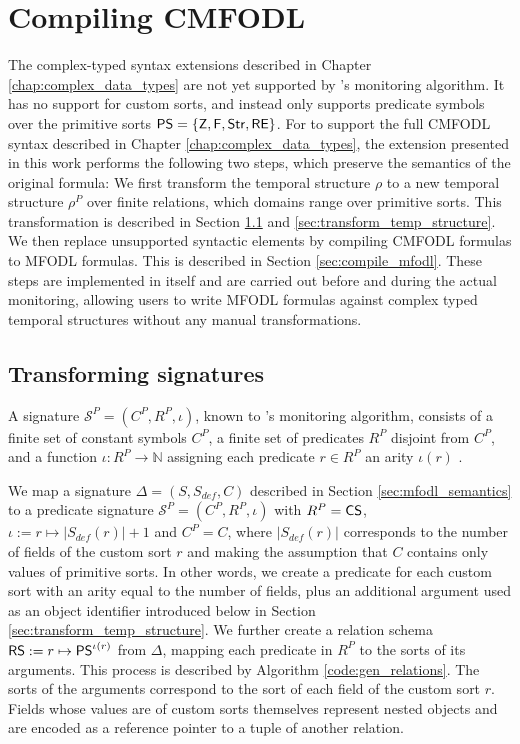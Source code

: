 \chapter{Compiling CMFODL}
\label{chap:compilation}

The complex-typed syntax extensions described in Chapter \ref{chap:complex_data_types} are not yet supported by \MonPoly's monitoring algorithm. It has no support for custom sorts, and instead only supports predicate symbols over the primitive sorts $\mathsf{PS} = \{ \mathsf{Z}, \mathsf{F}, \mathsf{Str}, \mathsf{RE} \}$. For \MonPoly to support the full CMFODL syntax described in Chapter \ref{chap:complex_data_types}, the extension presented in this work performs the following two steps, which preserve the semantics of the original formula: We first transform the temporal structure $\rho$ to a new temporal structure $\rho^P$ over finite relations, which domains range over primitive sorts. This transformation is described in Section \ref{sec:transform_signatures} and \ref{sec:transform_temp_structure}. We then replace unsupported syntactic elements by compiling CMFODL formulas to MFODL formulas. This is described in Section \ref{sec:compile_mfodl}. These steps are implemented in \MonPoly itself and are carried out before and during the actual monitoring, allowing users to write MFODL formulas against complex typed temporal structures without any manual transformations.

\section{Transforming signatures}
\label{sec:transform_signatures}
A signature $\mathcal{S}^P = (C^P, R^P, \iota)$, known to \MonPoly's monitoring algorithm, consists of a finite set of constant symbols $C^P$, a finite set of predicates $R^P$ disjoint from $C^P$, and a function $\iota : R^P \to \mathds{N}$ assigning each predicate $r \in R^P$ an arity $\iota(r)$ \cite{basinMonitoringMetricFirstorder2015}.

We map a signature $\Delta = (S, S_{def}, C)$ described in Section \ref{sec:mfodl_semantics} to a predicate signature $\mathcal{S}^P = (C^P, R^P, \iota)$ with $R^P = \mathsf{CS}$, $\iota := r \mapsto |S_{def}(r)|+1$ and $C^P = C$, where $|S_{def}(r)|$ corresponds to the number of fields of the custom sort $r$ and making the assumption that $C$ contains only values of primitive sorts. In other words, we create a predicate for each custom sort with an arity equal to the number of fields, plus an additional argument used as an object identifier introduced below in Section \ref{sec:transform_temp_structure}. We further create a relation schema $\mathsf{RS} := r \mapsto \mathsf{PS}^{\iota(r)}$ from $\Delta$, mapping each predicate in $R^P$ to the sorts of its arguments. This process is described by Algorithm \ref{code:gen_relations}. The sorts of the arguments correspond to the sort of each field of the custom sort $r$. Fields whose values are of custom sorts themselves represent nested objects and are encoded as a reference pointer to a tuple of another relation.

